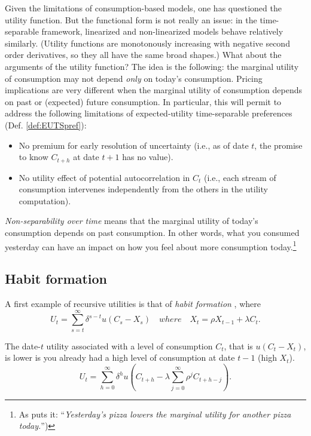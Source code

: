 \documentclass[
  12pt,
]{book}
\providecommand{\tightlist}{%
  \setlength{\itemsep}{0pt}\setlength{\parskip}{0pt}}
\theoremstyle{definition}
\theoremstyle{definition}
\theoremstyle{definition}
\theoremstyle{definition}
\theoremstyle{remark}
\begin{document}
Given the limitations of consumption-based models, one has questioned the utility function. But the functional form is not really an issue: in the time-separable framework, linearized and non-linearized models behave relatively similarly. (Utility functions are monotonously increasing with negative second order derivatives, so they all have the same broad shapes.) What about the arguments of the utility function? The idea is the following: the marginal utility of consumption may not depend \emph{only} on today's consumption. Pricing implications are very different when the marginal utility of consumption depends on past or (expected) future consumption. In particular, this will permit to address the following limitations of expected-utility time-separable preferences (Def. \ref{def:EUTSpref}):

\begin{itemize}
\tightlist
\item
  No premium for early resolution of uncertainty (i.e., as of date \(t\), the promise to know \(C_{t+h}\) at date \(t+1\) has no value).
\item
  No utility effect of potential autocorrelation in \(C_t\) (i.e., each stream of consumption intervenes independently from the others in the utility computation).
\end{itemize}

\emph{Non-separability over time} means that the marginal utility of today's consumption depends on past consumption. In other words, what you consumed yesterday can have an impact on how you feel about more consumption today.\footnote{As \citet{Cochrane_2005} puts it: ``\emph{Yesterday's pizza lowers the marginal utility for another pizza today.}'')}

\hypertarget{habit-formation}{%
\subsection{Habit formation}\label{habit-formation}}

A first example of recursive utilities is that of \emph{habit formation} \citep{Campbell_Shiller_1999}, where
\begin{equation}
U_t = \sum_{s=t}^{\infty} \delta^{s-t} u(C_s - X_s) \quad where \quad X_t = \rho X_{t-1} + \lambda C_t.\label{eq:Uhabitnonstoch}
\end{equation}

The date-\(t\) utility associated with a level of consumption \(C_t\), that is \(u(C_t - X_t)\), is lower is you already had a high level of consumption at date \(t-1\) (high \(X_t\)).
\[
U_t = \sum_{h=0}^{\infty} \delta^{h}u\left(C_{t+h} - \lambda \sum_{j=0}^\infty \rho^j C_{t+h-j}\right).
\]
\end{document}
